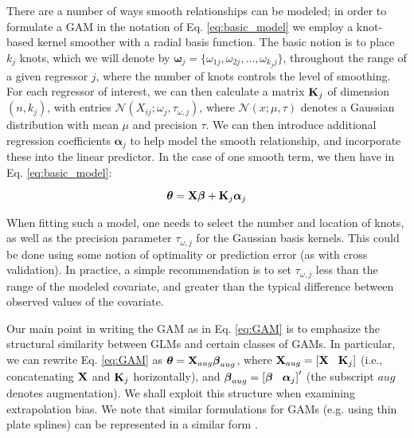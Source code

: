 \documentclass[12pt,fleqn]{article}
\begin{document}
\begin{flushleft}
There are a number of ways smooth relationships can be modeled; in order to formulate a GAM in the notation of Eq. \ref{eq:basic_model} we employ a knot-based kernel smoother with a radial basis function.  The basic notion is to place $k_j$ knots, which we will denote by $\boldsymbol{\omega}_j = \{ \omega_{1j},\omega_{2j},\hdots,\omega_{k_j j} \}$, throughout the range of a given regressor $j$, where the number of knots controls the level of smoothing.  For each regressor of interest, we can then calculate a matrix ${\bf K}_j$ of dimension $(n,k_j)$, with entries $\mathcal{N}(X_{ij};\omega_j,\tau_{\omega,j})$, where $\mathcal{N}(x;\mu,\tau)$ denotes a Gaussian distribution with mean $\mu$ and precision $\tau$.  We can then introduce additional regression coefficients $\boldsymbol{\alpha}_j$ to help model the smooth relationship, and incorporate these into the linear predictor.  In the case of one smooth term, we then have  in Eq. \ref{eq:basic_model}:
\begin{linenomath*}
\begin{equation}
  \label{eq:GAM}
  \boldsymbol{\theta}={\bf X} \boldsymbol{\beta} + {\bf K}_j \boldsymbol{\alpha}_j
\end{equation}
\end{linenomath*}
When fitting such a model, one needs to select the number and location of knots, as well as the precision parameter $\tau_{\omega,j}$ for the Gaussian basis kernels.  This could be done using some notion of optimality or prediction error (as with cross validation).  In practice, a simple recommendation is to set $\tau_{\omega,j}$ less than the range of the modeled covariate, and greater than the typical difference between observed values of the covariate.

Our main point in writing the GAM as in Eq. \ref{eq:GAM} is to emphasize the structural similarity between GLMs and certain classes
of GAMs.  In particular,
we can rewrite Eq. \ref{eq:GAM} as
$\boldsymbol{\theta}={\bf X}_{aug} \boldsymbol{\beta}_{aug}$,
where ${\bf X}_{aug} = \left[ {\bf X} \hspace{3mm} {\bf K}_j \right]$ (i.e., concatenating ${\bf X}$ and ${\bf K}_j$ horizontally), and $\boldsymbol{\beta}_{aug}=\left[  \boldsymbol{\beta} \hspace{3mm} \boldsymbol{\alpha}_j \right] ^\prime$ (the subscript $aug$ denotes augmentation).  We shall exploit this structure when examining
extrapolation bias.  We note that similar formulations for GAMs (e.g. using thin plate splines) can be represented in a similar form \citep[cf.][]{CrainiceanuEtAl2005}.


\end{flushleft}
\end{document}
